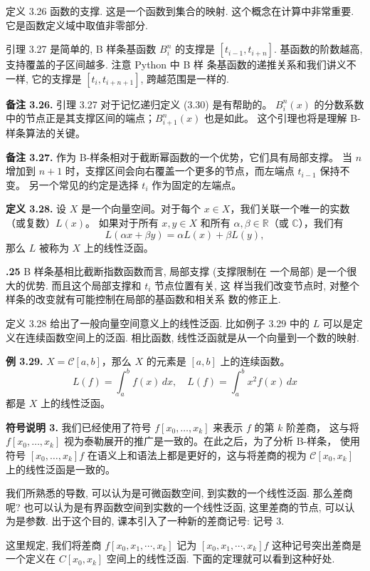 \documentclass[a4paper]{ctexart}
\newcommand{\remark}[1]
{\noindent {\bf Remark {#1}}}
\begin{document}
{定义 3.26 函数的支撑. 这是一个函数到集合的映射. 这个概念在计算中非常重要. 
它是函数定义域中取值非零部分.

引理 3.27 是简单的, B 样条基函数 $B_i^n$ 的支撑是 $[t_{i - 1}, t_{i +
    n}]$. 基函数的阶数越高, 支持覆盖的子区间越多. 注意 Python 中 B 样
条基函数的递推关系和我们讲义不一样, 它的支撑是 $[t_i, t_{i + n + 1}]$,
跨越范围是一样的.

\noindent \textbf{备注 3.26.} 引理 3.27 对于记忆递归定义 (3.30) 是有帮助的。
$B_{i}^{n}(x)$ 的分数系数中的节点正是其支撑区间的端点；$B_{i+1}^{n}(x)$ 也是如此。
这个引理也将是理解 B-样条算法的关键。

\noindent \textbf{备注 3.27.} 作为 B-样条相对于截断幂函数的一个优势，它们具有局部支撑。
当 $n$ 增加到 $n + 1$ 时，支撑区间会向右覆盖一个更多的节点，而左端点 $t_{i-1}$ 保持不变。
另一个常见的约定是选择 $t_{i}$ 作为固定的左端点。

\noindent \textbf{定义 3.28.} 设 $X$ 是一个向量空间。对于每个 $x\in X$，我们关联一个唯一的实数（或复数）$L(x)$。
如果对于所有 $x, y\in X$ 和所有 $\alpha, \beta\in \mathbb{R}$（或 $\mathbb{C}$），我们有
\[
L(\alpha x + \beta y) = \alpha L(x) + \beta L(y),
\tag{3.36}
\]
那么 $L$ 被称为 $X$ 上的线性泛函。

{\bf \remark 3.25} B 样条基相比截断指数函数而言, 局部支撑 (支撑限制在
一个局部) 是一个很大的优势. 而且这个局部支撑和 $t_i$ 节点位置有关, 这
样当我们改变节点时, 对整个样条的改变就有可能控制在局部的基函数和相关系
数的修正上.

定义 3.28 给出了一般向量空间意义上的线性泛函. 比如例子 3.29 中的 $L$
可以是定义在连续函数空间上的泛函. 相比函数, 线性泛函就是从一个向量到一个数的映射. 

\noindent \textbf{例 3.29.} $X=\mathcal{C}[a, b]$，那么 $X$ 的元素是 $[a, b]$ 上的连续函数。
\[
L(f)=\int_{a}^{b} f(x) \, dx, \quad L(f)=\int_{a}^{b} x^{2} f(x) \, dx
\]
都是 $X$ 上的线性泛函。

\noindent \textbf{符号说明 3.} 我们已经使用了符号 $f[x_{0}, \ldots, x_{k}]$ 来表示 $f$ 的第 $k$ 阶差商，
这与将 $f[x_{0}, \ldots, x_{k}]$ 视为泰勒展开的推广是一致的。在此之后，为了分析 B-样条，
使用符号 $[x_{0}, \ldots, x_{k}]f$ 在语义上和语法上都是更好的，这与将差商的视为 $\mathcal{C}[x_{0}, x_{k}]$ 上的线性泛函是一致的。

我们所熟悉的导数, 可以认为是可微函数空间, 到实数的一个线性泛函. 那么差商呢? 
也可以认为是有界函数空间到实数的一个线性泛函, 这里差商的节点, 可以认为是参数. 
出于这个目的, 课本引入了一种新的差商记号: 记号 3. 

这里规定, 我们将差商 $f[x_0, x_1, \cdots, x_k]$ 记为 $[x_0, x_1,
  \cdots, x_k] f$ 这种记号突出差商是一个定义在 $C[x_0, x_k]$ 
空间上的线性泛函. 下面的定理就可以看到这种好处.

}
\end{document}
